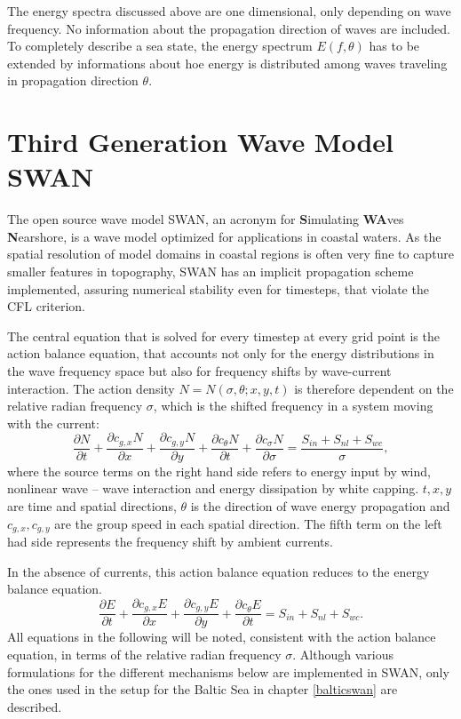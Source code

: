 The energy spectra discussed above are one dimensional, only depending on wave 
frequency. No information about the propagation direction of waves are 
included. To completely describe a sea state, the energy spectrum $E(f,\theta)$ 
has to be extended by informations about hoe energy is distributed among waves 
traveling in propagation direction $\theta$.

\section{Third Generation Wave Model SWAN}

The open source wave model SWAN, an acronym for \textbf{S}imulating \textbf{WA}ves \textbf{N}earshore, is a wave model optimized for applications in coastal waters. As the spatial resolution of model domains in coastal regions is often very fine to capture smaller features in topography, SWAN has an implicit propagation scheme implemented, assuring numerical stability even for timesteps, that violate the CFL criterion. 

The central equation that is solved for every timestep at every grid point is 
the action balance equation, that accounts not only for the energy distributions 
in the wave frequency space but also for frequency shifts by wave-current 
interaction. The action density $N=N(\sigma,\theta; x,y,t)$ is therefore 
dependent on the relative radian frequency $\sigma$, which is the shifted 
frequency in a system moving with the current:
\begin{equation}\label{ebe}
 \frac{\partial N}{\partial t} + \frac{\partial c_{g,x} N}{\partial x} + \frac{ \partial c_{g,y} N}{\partial y} + \frac{\partial c_{\theta} N}{\partial t} + \frac{\partial c_{\sigma} N}{\partial \sigma}= \frac{S_{in} + S_{nl} + S_{wc}}{\sigma},
\end{equation}
where the source terms on the right hand side refers to energy input by wind, 
nonlinear wave -- wave interaction and energy dissipation by white capping. $t, 
x ,y$ are time and spatial directions, $\theta$ is the direction of wave energy 
propagation and $c_{g,x}, c_{g,y}$ are the group speed in each spatial 
direction. The fifth term on the left had side represents the frequency shift by 
ambient currents.

In the absence of currents, this action balance equation reduces to the energy balance equation.
\begin{equation}\label{ebe}
 \frac{\partial E}{\partial t} + \frac{\partial c_{g,x} E}{\partial x} + \frac{ \partial c_{g,y} E}{\partial y} + \frac{\partial c_{\theta} E}{\partial t} = S_{in} + S_{nl} + S_{wc}.
\end{equation}
All equations in the following will be noted, consistent with the action balance equation, in terms of the relative radian frequency $\sigma$. Although various formulations for the different mechanisms below are implemented in SWAN, only the ones used in the setup for the Baltic Sea in chapter \ref{balticswan} are described.

